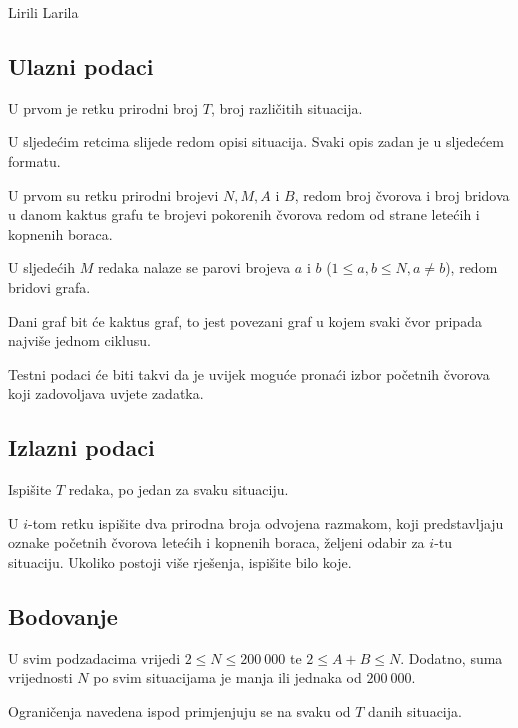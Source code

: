 \begin{statement}[
  problempoints=100,
  timelimit=3 sekunde,
  memorylimit=512 MiB,
]{Lirili Larila}
\subsection*{Ulazni podaci}

U prvom je retku prirodni broj $T$, broj različitih situacija.

U sljedećim retcima slijede redom opisi situacija. Svaki opis zadan je u sljedećem formatu.

U prvom su retku prirodni brojevi $N, M, A$ i $B$, redom broj čvorova i broj bridova 
u danom kaktus grafu te brojevi pokorenih čvorova redom od strane letećih i kopnenih boraca.

U sljedećih $M$ redaka nalaze se parovi brojeva $a$ i $b$ ($1 \leq a, b \leq N, a \ne b$), 
redom bridovi grafa. 

Dani graf bit će kaktus graf, to jest povezani graf u kojem svaki čvor pripada najviše jednom 
ciklusu. 

Testni podaci će biti takvi da je uvijek moguće pronaći izbor početnih čvorova koji zadovoljava 
uvjete zadatka. 

\subsection*{Izlazni podaci}

Ispišite $T$ redaka, po jedan za svaku situaciju. 

U $i$-tom retku ispišite dva prirodna broja odvojena razmakom, koji 
predstavljaju oznake početnih čvorova letećih i kopnenih boraca, 
željeni odabir za $i$-tu situaciju. 
Ukoliko postoji više rješenja, ispišite bilo koje. 

\subsection*{Bodovanje}

U svim podzadacima vrijedi $2 \leq N \leq 200~000$ te $2 \leq A + B \leq N$. 
Dodatno, suma vrijednosti $N$ po svim situacijama je manja ili jednaka od $200~000$.

Ograničenja navedena ispod primjenjuju se na svaku od $T$ danih situacija. 


\end{statement}

